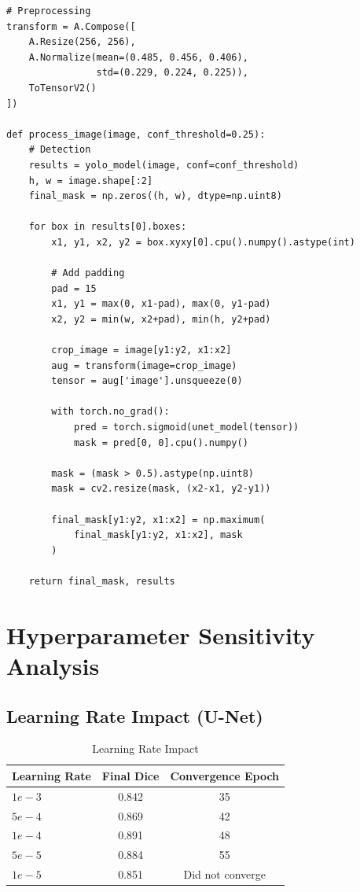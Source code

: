 \documentclass[runningheads]{llncs}
\begin{document}
\begin{verbatim}
# Preprocessing
transform = A.Compose([
    A.Resize(256, 256),
    A.Normalize(mean=(0.485, 0.456, 0.406), 
                std=(0.229, 0.224, 0.225)),
    ToTensorV2()
])

def process_image(image, conf_threshold=0.25):
    # Detection
    results = yolo_model(image, conf=conf_threshold)
    h, w = image.shape[:2]
    final_mask = np.zeros((h, w), dtype=np.uint8)
    
    for box in results[0].boxes:
        x1, y1, x2, y2 = box.xyxy[0].cpu().numpy().astype(int)
        
        # Add padding
        pad = 15
        x1, y1 = max(0, x1-pad), max(0, y1-pad)
        x2, y2 = min(w, x2+pad), min(h, y2+pad)
        
        crop_image = image[y1:y2, x1:x2]
        aug = transform(image=crop_image)
        tensor = aug['image'].unsqueeze(0)
        
        with torch.no_grad():
            pred = torch.sigmoid(unet_model(tensor))
            mask = pred[0, 0].cpu().numpy()
            
        mask = (mask > 0.5).astype(np.uint8)
        mask = cv2.resize(mask, (x2-x1, y2-y1))
        
        final_mask[y1:y2, x1:x2] = np.maximum(
            final_mask[y1:y2, x1:x2], mask
        )
        
    return final_mask, results
\end{verbatim}

\section{Hyperparameter Sensitivity Analysis}

\subsection{Learning Rate Impact (U-Net)}
\begin{table}[H]
\caption{Learning Rate Impact}
\centering
\begin{tabular}{lcc}
\toprule
\textbf{Learning Rate} & \textbf{Final Dice} & \textbf{Convergence Epoch} \\
\midrule
$1e-3$ & 0.842 & 35 \\
$5e-4$ & 0.869 & 42 \\
$1e-4$ & 0.891 & 48 \\
$5e-5$ & 0.884 & 55 \\
$1e-5$ & 0.851 & Did not converge \\
\bottomrule
\end{tabular}
\end{table}
\end{document}
